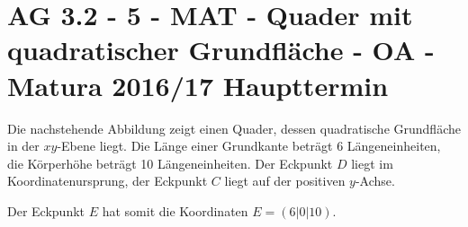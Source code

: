 \section{AG 3.2 - 5 - MAT - Quader mit quadratischer Grundfläche - OA - Matura 2016/17 Haupttermin}

\begin{beispiel}[AG 3.2]{1} %

Die nachstehende Abbildung zeigt einen Quader, dessen quadratische Grundfläche in der
$xy$-Ebene liegt. Die Länge einer Grundkante beträgt 6 Längeneinheiten, die Körperhöhe beträgt
10 Längeneinheiten. Der Eckpunkt $D$ liegt im Koordinatenursprung, der Eckpunkt $C$ liegt auf der positiven $y$-Achse. \leer

Der Eckpunkt $E$ hat somit die Koordinaten $E = (6|0|10)$.


\end{beispiel}
